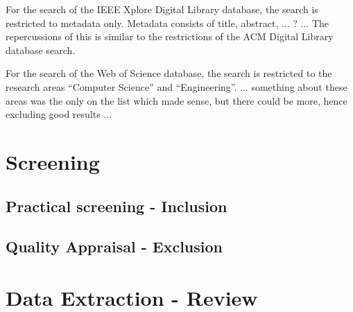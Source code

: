 For the search of the IEEE Xplore Digital Library database, the search is restricted to metadata only.
Metadata consists of title, abstract, ... ? ...
The repercussions of this is similar to the restrictions of the ACM Digital Library database search.
 
For the search of the Web of Science database, the search is restricted to the research areas “Computer Science” and “Engineering”.
... something about these areas was the only on the list which made sense, but there could be more, hence excluding good results ...

\section{Screening}
\subsection{Practical screening - Inclusion}



\subsection{Quality Appraisal - Exclusion}





\section{Data Extraction - Review}




